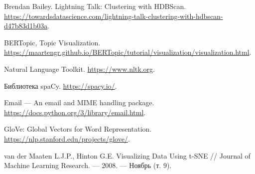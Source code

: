\begin{thebibliography}{3}
Brendan Bailey. Lightning Talk: Clustering with HDBScan. \url{https://towardsdatascience.com/lightning-talk-clustering-with-hdbscan-d47b83d1b03a}.

BERTopic, Topic Visualization. \url{https://maartengr.github.io/BERTopic/tutorial/visualization/visualization.html}.

Natural Language Toolkit.
\url{https://www.nltk.org}.

Библиотека spaCy. \url{https://spacy.io/}.

Email — An email and MIME handling package. \url{https://docs.python.org/3/library/email.html}.


GloVe: Global Vectors for Word Representation. \url{https://nlp.stanford.edu/projects/glove/}.

van der Maaten L.J.P., Hinton G.E. Visualizing Data Using t-SNE // Journal of Machine Learning Research. — 2008. — Ноябрь (т. 9).



\end{thebibliography}


